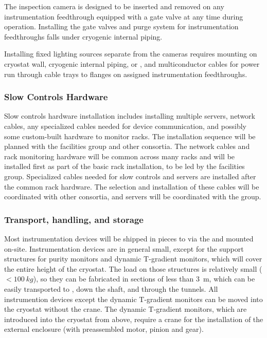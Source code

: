 The inspection camera is designed to be inserted and removed on any
instrumentation feedthrough equipped with a gate valve at any time
during operation.  Installing the gate valves and purge system
for instrumentation feedthroughs falls under cryogenic internal
piping.

Installing fixed lighting sources separate from the cameras
requires mounting on cryostat wall, cryogenic internal piping, or
, and multiconductor cables for power run through cable
trays to flanges on assigned instrumentation feedthroughs.



\subsubsection{Slow Controls Hardware}
\label{sec:fdgen-slow-cryo-install-sc-hard}

Slow controls hardware installation %
includes installing multiple
servers, network cables, any specialized cables needed
for device communication, and possibly some custom-built hardware to monitor racks. The installation sequence will be 
planned with the facilities group and other consortia. The network
cables and rack monitoring hardware will be common across many racks
and will be installed first as part of the basic rack installation, %
to be led by the facilities group. Specialized cables needed for slow controls and servers %
are installed
after the common rack hardware. The selection and installation of these cables will be coordinated
with other consortia, and servers will be coordinated with the  group.

\subsubsection{Transport, handling, and storage}
\label{sec:fdgen-slow-cryo-install-transport}


Most instrumentation devices will be shipped in pieces to \surf via the  and mounted on-site. 
Instrumentation devices are in general small, except for  %
the support structures for purity monitors and dynamic T-gradient monitors,
which will cover the entire height of the cryostat. The load on those structures is relatively small (\(<\SI{100}{kg}\)), so they can be fabricated in sections of less than \SI{3}{m},
which can be easily transported to \surf, down the shaft, and through the tunnels.
All instrumention devices except the dynamic T-gradient monitors can be moved into the cryostat without the crane. The dynamic T-gradient monitors, which %
are introduced into the cryostat from above, %
require a crane for the installation of the external enclosure (with preassembled motor, pinion and gear). %


